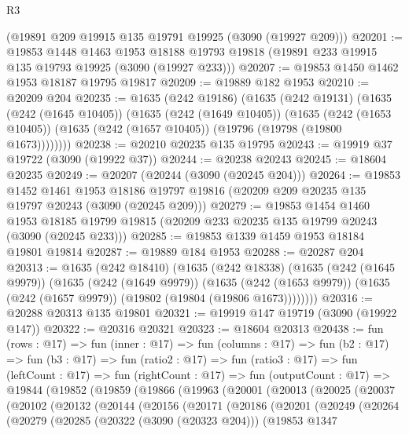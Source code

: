 \begin{lexlean}{R3}
\begin{coremodule}
    (@19891 @209 @19915 @135 @19791 @19925 (@3090 (@19927 @209)))
@20201 := @19853
    @1448
    @1463
    @1953
    @18188
    @19793
    @19818
    (@19891 @233 @19915 @135 @19793 @19925 (@3090 (@19927 @233)))
@20207 := @19853 @1450 @1462 @1953 @18187 @19795 @19817
@20209 := @19889 @182 @1953
@20210 := @20209 @204
@20235 := @1635
    (@242 @19186)
    (@1635
      (@242 @19131)
      (@1635
        (@242 (@1645 @10405))
        (@1635
          (@242 (@1649 @10405))
          (@1635
            (@242 (@1653 @10405))
            (@1635 (@242 (@1657 @10405)) (@19796 (@19798 (@19800 @1673))))))))
@20238 := @20210 @20235 @135 @19795
@20243 := @19919 @37 @19722 (@3090 (@19922 @37))
@20244 := @20238 @20243
@20245 := @18604 @20235
@20249 := @20207 (@20244 (@3090 (@20245 @204)))
@20264 := @19853
    @1452
    @1461
    @1953
    @18186
    @19797
    @19816
    (@20209 @209 @20235 @135 @19797 @20243 (@3090 (@20245 @209)))
@20279 := @19853
    @1454
    @1460
    @1953
    @18185
    @19799
    @19815
    (@20209 @233 @20235 @135 @19799 @20243 (@3090 (@20245 @233)))
@20285 := @19853 @1339 @1459 @1953 @18184 @19801 @19814
@20287 := @19889 @184 @1953
@20288 := @20287 @204
@20313 := @1635
    (@242 @18410)
    (@1635
      (@242 @18338)
      (@1635
        (@242 (@1645 @9979))
        (@1635
          (@242 (@1649 @9979))
          (@1635
            (@242 (@1653 @9979))
            (@1635 (@242 (@1657 @9979)) (@19802 (@19804 (@19806 @1673))))))))
@20316 := @20288 @20313 @135 @19801
@20321 := @19919 @147 @19719 (@3090 (@19922 @147))
@20322 := @20316 @20321
@20323 := @18604 @20313
@20438 := fun (rows : @17) =>
  fun (inner : @17) =>
  fun (columns : @17) =>
  fun (b2 : @17) =>
  fun (b3 : @17) =>
  fun (ratio2 : @17) =>
  fun (ratio3 : @17) =>
  fun (leftCount : @17) =>
  fun (rightCount : @17) =>
  fun (outputCount : @17) =>
  @19844
    (@19852
      (@19859
        (@19866
          (@19963
            (@20001
              (@20013
                (@20025
                  (@20037
                    (@20102
                      (@20132
                        (@20144
                          (@20156
                            (@20171
                              (@20186
                                (@20201
                                  (@20249
                                    (@20264
                                      (@20279
                                        (@20285
                                          (@20322 (@3090 (@20323 @204)))
                                          (@19853
                                            @1347

\end{coremodule}
\end{lexlean}
